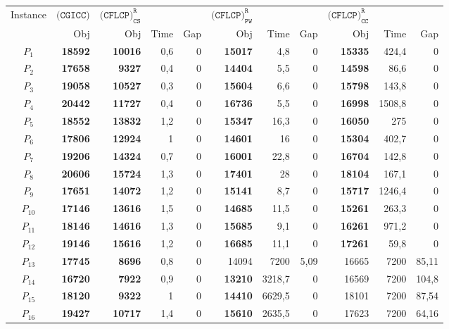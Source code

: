 \documentclass[preprint,11pt,authoryear]{elsarticle}
\begin{document}
\begin{table}
\centering
\begin{adjustbox}{max width=\textwidth}
\begin{tabular}{c r rrr rrr rrr}
\toprule
Instance & $\texttt{(CGICC)}$ & $\texttt{(CFLCP)}_{\texttt{CS}}^\texttt{R}$ & & & $\texttt{(CFLCP)}_{\texttt{PW}}^\texttt{R}$ & & & $\texttt{(CFLCP)}_{\texttt{CC}}^\texttt{R}$& & \\
\cmidrule(lr){2-2} \cmidrule(lr){3-5} \cmidrule(lr){6-8}  \cmidrule(lr){9-11}
& Obj & Obj & Time & Gap & Obj & Time & Gap & Obj & Time & Gap \\
\midrule
$P_1$&\textbf{18592}&\textbf{10016}&0,6&0&\textbf{15017}&4,8&0&\textbf{15335}&424,4&0 \\
$P_2$&\textbf{17658}&\textbf{9327}&0,4&0&\textbf{14404}&5,5&0&\textbf{14598}&86,6&0 \\
$P_3$&\textbf{19058}&\textbf{10527}&0,3&0&\textbf{15604}&6,6&0&\textbf{15798}&143,8&0 \\
$P_4$&\textbf{20442}&\textbf{11727}&0,4&0&\textbf{16736}&5,5&0&\textbf{16998}&1508,8&0 \\[2mm]
$P_5$&\textbf{18552}&\textbf{13832}&1,2&0&\textbf{15347}&16,3&0&\textbf{16050}&275&0 \\
$P_6$&\textbf{17806}&\textbf{12924}&1&0&\textbf{14601}&16&0&\textbf{15304}&402,7&0 \\
$P_7$&\textbf{19206}&\textbf{14324}&0,7&0&\textbf{16001}&22,8&0&\textbf{16704}&142,8&0 \\
$P_8$&\textbf{20606}&\textbf{15724}&1,3&0&\textbf{17401}&28&0&\textbf{18104}&167,1&0 \\[2mm]
$P_9$&\textbf{17651}&\textbf{14072}&1,2&0&\textbf{15141}&8,7&0&\textbf{15717}&1246,4&0 \\
$P_{10}$&\textbf{17146}&\textbf{13616}&1,5&0&\textbf{14685}&11,5&0&\textbf{15261}&263,3&0 \\
$P_{11}$&\textbf{18146}&\textbf{14616}&1,3&0&\textbf{15685}&9,1&0&\textbf{16261}&971,2&0 \\
$P_{12}$&\textbf{19146}&\textbf{15616}&1,2&0&\textbf{16685}&11,1&0&\textbf{17261}&59,8&0  \\[2mm]
$P_{13}$&\textbf{17745}&\textbf{8696}&0,8&0&14094&7200&5,09&16665&7200&85,11 \\
$P_{14}$&\textbf{16720}&\textbf{7922}&0,9&0&\textbf{13210}&3218,7&0&16569&7200&104,8 \\
$P_{15}$&\textbf{18120}&\textbf{9322}&1&0&\textbf{14410}&6629,5&0&18101&7200&87,54 \\
$P_{16}$&\textbf{19427}&\textbf{10717}&1,4&0&\textbf{15610}&2635,5&0&17623&7200&64,16 \\[2mm]

\end{tabular}
\end{adjustbox}
\end{table}
\end{document}
